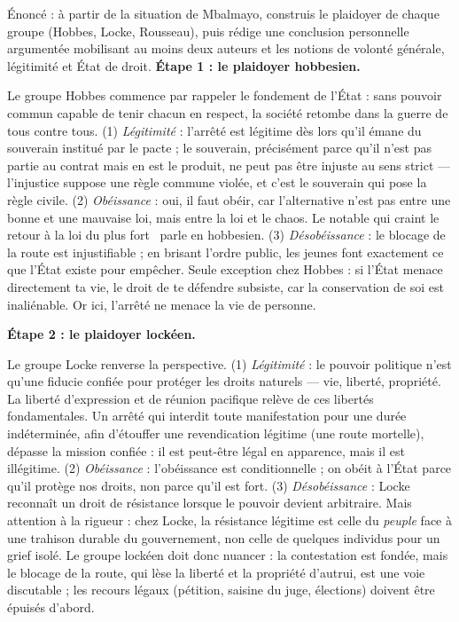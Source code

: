 \documentclass[11pt]{article}
\begin{document}
\begin{exoresolu}
Énoncé : à partir de la situation de Mbalmayo, construis le plaidoyer de chaque groupe (Hobbes, Locke, Rousseau), puis rédige une conclusion personnelle argumentée mobilisant au moins deux auteurs et les notions de volonté générale, légitimité et État de droit.
\tcblower
\textbf{Étape 1 : le plaidoyer hobbesien.}\par
Le groupe Hobbes commence par rappeler le fondement de l'État : sans pouvoir commun capable de tenir chacun en respect, la société retombe dans la guerre de tous contre tous. (1) \emph{Légitimité} : l'arrêté est légitime dès lors qu'il émane du souverain institué par le pacte ; le souverain, précisément parce qu'il n'est pas partie au contrat mais en est le produit, ne peut pas être injuste au sens strict — l'injustice suppose une règle commune violée, et c'est le souverain qui pose la règle civile. (2) \emph{Obéissance} : oui, il faut obéir, car l'alternative n'est pas entre une bonne et une mauvaise loi, mais entre la loi et le chaos. Le notable qui craint \guillemotleft le retour à la loi du plus fort \guillemotright\ parle en hobbesien. (3) \emph{Désobéissance} : le blocage de la route est injustifiable ; en brisant l'ordre public, les jeunes font exactement ce que l'État existe pour empêcher. Seule exception chez Hobbes : si l'État menace directement ta vie, le droit de te défendre subsiste, car la conservation de soi est inaliénable. Or ici, l'arrêté ne menace la vie de personne.\par
\textbf{Étape 2 : le plaidoyer lockéen.}\par
Le groupe Locke renverse la perspective. (1) \emph{Légitimité} : le pouvoir politique n'est qu'une fiducie confiée pour protéger les droits naturels — vie, liberté, propriété. La liberté d'expression et de réunion pacifique relève de ces libertés fondamentales. Un arrêté qui interdit toute manifestation pour une durée indéterminée, afin d'étouffer une revendication légitime (une route mortelle), dépasse la mission confiée : il est peut-être légal en apparence, mais il est illégitime. (2) \emph{Obéissance} : l'obéissance est conditionnelle ; on obéit à l'État parce qu'il protège nos droits, non parce qu'il est fort. (3) \emph{Désobéissance} : Locke reconnaît un droit de résistance lorsque le pouvoir devient arbitraire. Mais attention à la rigueur : chez Locke, la résistance légitime est celle du \emph{peuple} face à une trahison durable du gouvernement, non celle de quelques individus pour un grief isolé. Le groupe lockéen doit donc nuancer : la contestation est fondée, mais le blocage de la route, qui lèse la liberté et la propriété d'autrui, est une voie discutable ; les recours légaux (pétition, saisine du juge, élections) doivent être épuisés d'abord.\par

\end{exoresolu}
\end{document}

